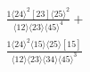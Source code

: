 \documentclass[varwidth, border=5pt]{standalone}
\begin{document}
\begin{my}
$\begin{gathered}
\scriptscriptstyle\frac{1⟨24⟩^2[23]⟨25⟩^2}{⟨12⟩⟨23⟩⟨45⟩^4}+\\
\scriptscriptstyle\frac{1⟨24⟩^2⟨15⟩⟨25⟩[15]}{⟨12⟩⟨23⟩⟨34⟩⟨45⟩^3}\phantom{+}
\end{gathered}$
\end{my}
\end{document}
